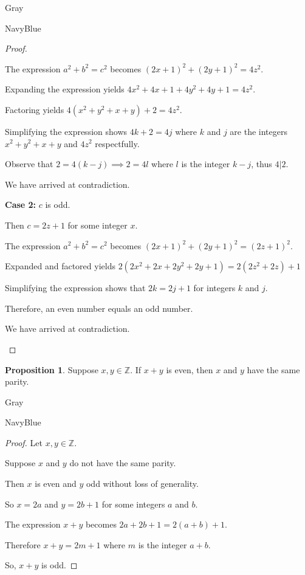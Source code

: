 \documentclass[12pt]{amsart}
\theoremstyle{named}
\newenvironment{prf}
{\medskip\begin{color}{Gray}\begin{framed}\begin{color}{NavyBlue}\begin{proof}[Proof]
\doublespacing}
{\end{proof}\end{color}\end{framed}\end{color}\medskip}
\theoremstyle{definition}
\newtheorem{proposition}{Proposition}
\newcommand{\Z}{\mathbb Z}
\begin{document}
\begin{prf}
\begin{adjustwidth}{2em}{0em}
		The expression $a^2 + b^2 = c^2$ becomes $(2x + 1)^2 + (2y+1)^2 = 4z^2$.

		Expanding the expression yields $4x^2 + 4x + 1 + 4y^2 + 4y + 1 = 4z^2$.

		Factoring yields $4(x^2+y^2+x+y)+2 = 4z^2$.

		Simplifying the expression shows $4k + 2 = 4j$ where $k$ and $j$ are
		the integers $x^2+y^2+x+y$ and $4z^2$ respectfully. 

		Observe that $2 = 4(k - j) \implies 2 = 4l$ where $l$ is the integer $k-j$, thus $4|2$.
		
		We have arrived at contradiction.
	\end{adjustwidth}

	\textbf{Case 2:} $c$ is odd.
	\begin{adjustwidth}{2em}{0em}
		Then $c = 2z + 1$ for some integer $x$.

		The expression $a^2 + b^2 = c^2$ becomes $(2x + 1)^2 + (2y+1)^2 = (2z+1)^2$.

		Expanded and factored yields $2(2x^2 + 2x + 2y^2 + 2y + 1) = 2(2z^2 + 2z) + 1$

		Simplifying the expression shows that $2k = 2j + 1$ for integers $k$ and $j$.

		Therefore, an even number equals an odd number. 
		
		We have arrived at contradiction.
	\end{adjustwidth}
\end{prf}

\phantom{ }

\phantom{ }

\phantom{ }

\phantom{ }
\begin{proposition}
	Suppose $x,y\in\Z$.
	If $x+y$ is even, then $x$ and $y$ have the same parity.
\end{proposition}

\begin{prf}
	\phantom{ }

	Let $x,y \in \mathbb Z$.
	
	Suppose $x$ and $y$ do not have the same parity.


	Then $x$ is even and $y$ odd without loss of generality.

	So $x = 2a$ and $y = 2b + 1$ for some integers $a$ and $b$.

	The expression $x + y$ becomes $2a + 2b + 1 = 2(a+b) + 1$.

	Therefore $x + y = 2m + 1$ where $m$ is the integer $a+b$.

	So, $x + y$ is odd.
\end{prf}
\end{document}
